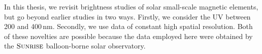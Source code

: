 \documentclass[goettingen, gauss, print]{thesis}
\begin{document}



In this thesis, we revisit brightness studies of solar small-scale magnetic elements, but go beyond earlier studies in two ways. Firstly, we consider the UV between 200 and 400\,nm. Secondly, we use data of constant high spatial resolution. Both of these novelties are possible because the data employed here were obtained by the $\textsc{Sunrise}$ balloon-borne solar observatory.   
\end{document}
